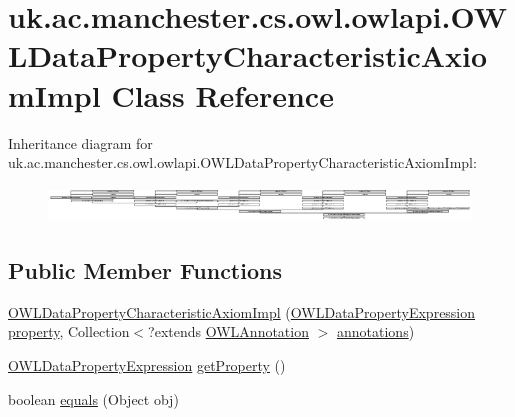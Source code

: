 \hypertarget{classuk_1_1ac_1_1manchester_1_1cs_1_1owl_1_1owlapi_1_1_o_w_l_data_property_characteristic_axiom_impl}{\section{uk.\-ac.\-manchester.\-cs.\-owl.\-owlapi.\-O\-W\-L\-Data\-Property\-Characteristic\-Axiom\-Impl Class Reference}
\label{classuk_1_1ac_1_1manchester_1_1cs_1_1owl_1_1owlapi_1_1_o_w_l_data_property_characteristic_axiom_impl}
}
Inheritance diagram for uk.\-ac.\-manchester.\-cs.\-owl.\-owlapi.\-O\-W\-L\-Data\-Property\-Characteristic\-Axiom\-Impl\-:\begin{figure}[H]
\begin{center}
\leavevmode
\includegraphics[height=0.936803cm]{classuk_1_1ac_1_1manchester_1_1cs_1_1owl_1_1owlapi_1_1_o_w_l_data_property_characteristic_axiom_impl}
\end{center}
\end{figure}
\subsection*{Public Member Functions}
\begin{DoxyCompactItemize}
\item 
\hyperlink{classuk_1_1ac_1_1manchester_1_1cs_1_1owl_1_1owlapi_1_1_o_w_l_data_property_characteristic_axiom_impl_a58b642cbedc3a9c8054d474ff066a0dd}{O\-W\-L\-Data\-Property\-Characteristic\-Axiom\-Impl} (\hyperlink{interfaceorg_1_1semanticweb_1_1owlapi_1_1model_1_1_o_w_l_data_property_expression}{O\-W\-L\-Data\-Property\-Expression} \hyperlink{classuk_1_1ac_1_1manchester_1_1cs_1_1owl_1_1owlapi_1_1_o_w_l_data_property_characteristic_axiom_impl_aef4c9490bb2baa33cc38110d4d03140a}{property}, Collection$<$?extends \hyperlink{interfaceorg_1_1semanticweb_1_1owlapi_1_1model_1_1_o_w_l_annotation}{O\-W\-L\-Annotation} $>$ \hyperlink{classuk_1_1ac_1_1manchester_1_1cs_1_1owl_1_1owlapi_1_1_o_w_l_axiom_impl_af6fbf6188f7bdcdc6bef5766feed695e}{annotations})
\item 
\hyperlink{interfaceorg_1_1semanticweb_1_1owlapi_1_1model_1_1_o_w_l_data_property_expression}{O\-W\-L\-Data\-Property\-Expression} \hyperlink{classuk_1_1ac_1_1manchester_1_1cs_1_1owl_1_1owlapi_1_1_o_w_l_data_property_characteristic_axiom_impl_a13ba09a82f31172e899fccefce029106}{get\-Property} ()
\item 
boolean \hyperlink{classuk_1_1ac_1_1manchester_1_1cs_1_1owl_1_1owlapi_1_1_o_w_l_data_property_characteristic_axiom_impl_a11cd03114dccddf399570ddc9f6b9b1f}{equals} (Object obj)
\end{DoxyCompactItemize}
